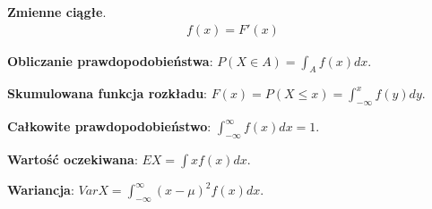\documentclass[12pt]{article}
\begin{document}
    \begin{definition}
        \textbf{Zmienne ciągłe}.
        \begin{align*}
            f(x) = F'(x)
        \end{align*}

        \textbf{Obliczanie prawdopodobieństwa}: $P(X \in A) = \int_{A} f(x)dx$.

        \textbf{Skumulowana funkcja rozkładu}: $F(x) = P(X \leq x) = \int_{-\infty}^{x}f(y)dy$.

        \textbf{Całkowite prawdopodobieństwo}: $\int_{- \infty}^{\infty}f(x)dx = 1$.

        \textbf{Wartość oczekiwana}: $EX = \int xf(x) dx$.

        \textbf{Wariancja}: $VarX = \int_{- \infty}^{\infty} (x - \mu)^2 f(x) dx$.
    \end{definition}
\end{document}
